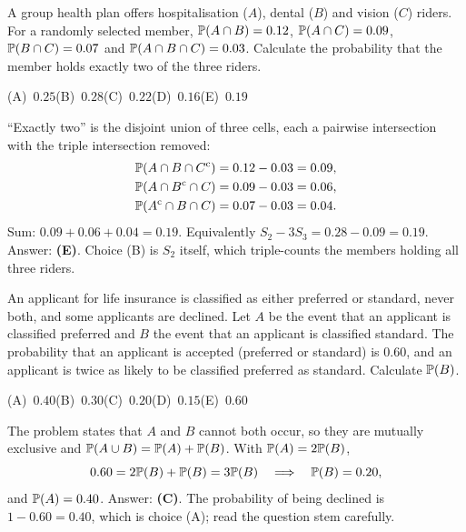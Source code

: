 \begin{example}
A group health plan offers hospitalisation ($A$), dental ($B$) and vision ($C$) riders. For a
randomly selected member, $\mathbb{P}(A \cap B) = 0.12$, $\mathbb{P}(A \cap C) = 0.09$,
$\mathbb{P}(B \cap C) = 0.07$ and $\mathbb{P}(A \cap B \cap C) = 0.03$. Calculate the probability that
the member holds exactly two of the three riders.

\smallskip\noindent (A)~$0.25$\hfill (B)~$0.28$\hfill (C)~$0.22$\hfill (D)~$0.16$\hfill (E)~$0.19$\hfill\mbox{}
\end{example}
\begin{solution}
``Exactly two'' is the disjoint union of three cells, each a pairwise intersection with the
triple intersection removed:
\begin{align*}
\mathbb{P}(A \cap B \cap C^{\mathrm{c}}) &= 0.12 - 0.03 = 0.09, \\
\mathbb{P}(A \cap B^{\mathrm{c}} \cap C) &= 0.09 - 0.03 = 0.06, \\
\mathbb{P}(A^{\mathrm{c}} \cap B \cap C) &= 0.07 - 0.03 = 0.04.
\end{align*}
Sum: $0.09 + 0.06 + 0.04 = 0.19$. Equivalently $S_2 - 3S_3 = 0.28 - 0.09 = 0.19$.
Answer: \textbf{(E)}. Choice (B) is $S_2$ itself, which triple-counts the members holding
all three riders.
\end{solution}

\begin{example}
An applicant for life insurance is classified as either preferred or standard, never both,
and some applicants are declined. Let $A$ be the event that an applicant is classified
preferred and $B$ the event that an applicant is classified standard. The probability that an
applicant is accepted (preferred or standard) is $0.60$, and an applicant is twice as likely
to be classified preferred as standard. Calculate $\mathbb{P}(B)$.

\smallskip\noindent (A)~$0.40$\hfill (B)~$0.30$\hfill (C)~$0.20$\hfill (D)~$0.15$\hfill (E)~$0.60$\hfill\mbox{}
\end{example}
\begin{solution}
The problem states that $A$ and $B$ cannot both occur, so they are mutually exclusive and
$\mathbb{P}(A \cup B) = \mathbb{P}(A) + \mathbb{P}(B)$. With $\mathbb{P}(A) = 2\mathbb{P}(B)$,
\[
0.60 = 2\mathbb{P}(B) + \mathbb{P}(B) = 3\mathbb{P}(B) \quad\Longrightarrow\quad \mathbb{P}(B) = 0.20,
\]
and $\mathbb{P}(A) = 0.40$. Answer: \textbf{(C)}. The probability of being declined is
$1 - 0.60 = 0.40$, which is choice (A); read the question stem carefully.
\end{solution}

